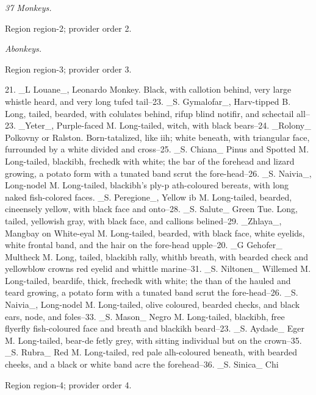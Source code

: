 \documentclass[11pt]{article}
\begin{document}
{\small\itshape 37 Monkeys.\par}

{\scriptsize\color{gray} Region region-2; provider order 2.\par}
\medskip

{\small\itshape Abonkeys.\par}

{\scriptsize\color{gray} Region region-3; provider order 3.\par}
\medskip

21. \_L Louane\_, Leonardo Monkey. Black, with callotion behind, very large whistle heard, and very long tufed tail--23. \_S. Gymalofar\_, Harv-tipped B. Long, tailed, bearded, with colulates behind, rifup blind notifir, and schectail all--23. \_Yeter\_, Purple-faced M. Long-tailed, witch, with black bears--24. \_Rolony\_ Polkovny or Ralston. Born-tatalized, like iih; white beneath, with triangular face, furrounded by a white divided and cross--25. \_S. Chiana\_ Pinus and Spotted M. Long-tailed, blackibh, frechedk with white; the bar of the forehead and lizard growing, a potato form with a tunated band scrut the fore-head--26. \_S. Naivia\_, Long-nodel M. Long-tailed, blackibh's ply-p ath-coloured bereats, with long naked fish-colored faces. \_S. Peregione\_, Yellow ib M. Long-tailed, bearded, cineensely yellow, with black face and onto--28. \_S. Salute\_ Green Tue. Long, tailed, yellowish gray, with black face, and callions belined--29. \_Zhlaya\_, Mangbay on White-eyal M. Long-tailed, bearded, with black face, white eyelids, white frontal band, and the hair on the fore-head upple--20. \_G Gehofer\_ Multheck M. Long, tailed, blackibh rally, whithb breath, with bearded check and yellowblow crowns red eyelid and whittle marine--31. \_S. Niltonen\_ Willemed M. Long-tailed, beardife, thick, frechedk with white; the than of the hauled and teard growing, a potato form with a tunated band scrut the fore-head--26. \_S. Naivia\_, Long-nodel M. Long-tailed, olive coloured, bearded checks, and black ears, node, and foles--33. \_S. Mason\_ Negro M. Long-tailed, blackibh, free flyerfly fish-coloured face and breath and blackikh beard--23. \_S. Aydade\_ Eger M. Long-tailed, bear-de fetly grey, with sitting individual but on the crown--35. \_S. Rubra\_ Red M. Long-tailed, red pale alh-coloured beneath, with bearded cheeks, and a black or white band acre the forehead--36. \_S. Sinica\_ Chi
\par

{\scriptsize\color{gray} Region region-4; provider order 4.\par}
\medskip
\end{document}
